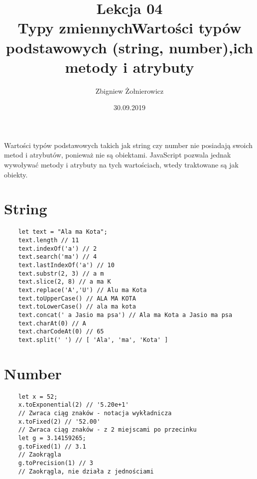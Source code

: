 \documentclass[a4paper]{article}
\begin{document}
\title{{\huge Lekcja 04} \\
    {\Large Typy zmiennych\linebreak Wartości typów podstawowych (string, number),\linebreak ich metody i atrybuty}}
\author{Zbigniew Żołnierowicz}
\date{30.09.2019}
\maketitle
Wartości typów podstawowych takich jak string czy number nie posiadają swoich metod i atrybutów, ponieważ nie są obiektami. JavaScript pozwala jednak wywoływać metody i atrybuty na tych wartościach, wtedy traktowane są jak obiekty.
\section{String}
\begin{verbatim}
    let text = "Ala ma Kota";
    text.length // 11
    text.indexOf('a') // 2
    text.search('ma') // 4
    text.lastIndexOf('a') // 10
    text.substr(2, 3) // a m
    text.slice(2, 8) // a ma K
    text.replace('A','U') // Alu ma Kota
    text.toUpperCase() // ALA MA KOTA
    text.toLowerCase() // ala ma kota
    text.concat(' a Jasio ma psa') // Ala ma Kota a Jasio ma psa
    text.charAt(0) // A
    text.charCodeAt(0) // 65
    text.split(' ') // [ 'Ala', 'ma', 'Kota' ]
\end{verbatim}
\section{Number}
\begin{verbatim}
    let x = 52;
    x.toExponential(2) // '5.20e+1'
    // Zwraca ciąg znaków - notacja wykładnicza
    x.toFixed(2) // '52.00'
    // Zwraca ciąg znaków - z 2 miejscami po przecinku
    let g = 3.14159265;
    g.toFixed(1) // 3.1
    // Zaokrągla
    g.toPrecision(1) // 3
    // Zaokrągla, nie działa z jednościami
\end{verbatim}
\end{document}
